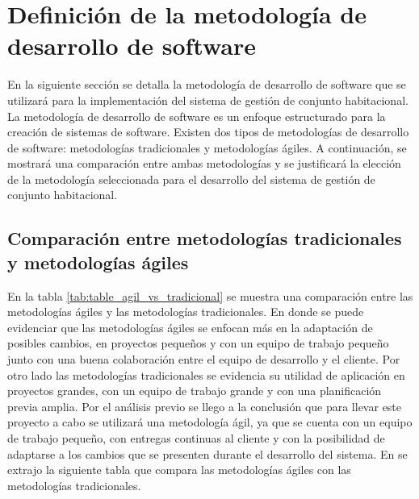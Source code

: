 \section{Definición de la metodología de desarrollo de software}\label{sec:definicion-metodologia}

En la siguiente sección se detalla la metodología de desarrollo de software que se utilizará para la implementación del sistema de gestión de conjunto habitacional.
La metodología de desarrollo de software es un enfoque estructurado para la creación de sistemas de software.
Existen dos tipos de metodologías de desarrollo de software: metodologías tradicionales y metodologías ágiles.
A continuación, se mostrará una comparación entre ambas metodologías y se justificará la elección de la metodología seleccionada para el desarrollo del sistema de gestión de conjunto habitacional.

\subsection{Comparación entre metodologías tradicionales y metodologías ágiles}\label{subsec:comparacion-entre-metodologias-tradicionales-y-metodologias-agiles}

En la tabla \ref{tab:table_agil_vs_tradicional} se muestra una comparación entre las metodologías ágiles y las metodologías tradicionales.
En donde se puede evidenciar que las metodologías ágiles se enfocan más en la adaptación de posibles cambios, en proyectos pequeños y con un equipo de trabajo pequeño junto con una buena colaboración entre el equipo de desarrollo y el cliente.
Por otro lado las metodologías tradicionales se evidencia su utilidad de aplicación en proyectos grandes, con un equipo de trabajo grande y con una planificación previa amplia.
Por el análisis previo se llego a la conclusión que para llevar este proyecto a cabo se utilizará una metodología ágil, ya que se cuenta con un equipo de trabajo pequeño, con entregas continuas al cliente y con la posibilidad de adaptarse a los cambios que se presenten durante el desarrollo del sistema.
En \cite{islam_comparison_2020} se extrajo la siguiente tabla que compara las metodologías ágiles con las metodologías tradicionales.

